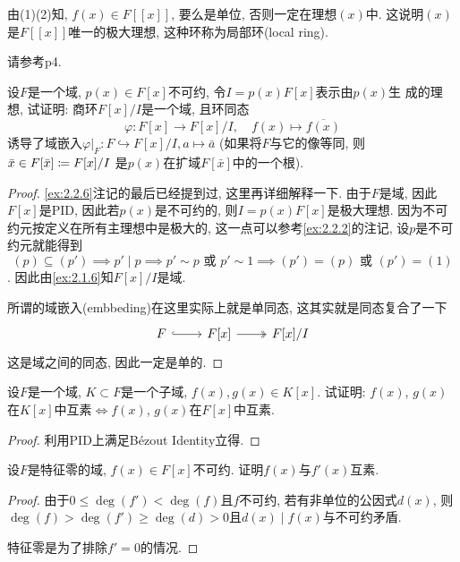 \begin{remark}
    由(1)(2)知, $f(x) \in F[[x]]$, 要么是单位, 否则一定在理想$(x)$中. 这说明$(x)$是$F[[x]]$唯一的极大理想, 这种环称为局部环(local ring).
    
    请参考\cite{atiyah1994introduction}p4.
\end{remark}

\begin{problem}
    设$F$是一个域, $p(x) \in F[x]$不可约, 令$I = p(x)F[x]$表示由$p(x)$生
成的理想, 试证明: 商环$F[x]/I$是一个域, 且环同态
\[
    \varphi:F[x] \to F[x]/I,\quad f(x) \mapsto \overline{f(x)}
\]
诱导了域嵌入$\varphi|_F: F\hookrightarrow F[x]/I, a \mapsto \bar{a}$
(如果将$F$与它的像等同, 则$\bar{x} \in F[\bar{x}] \mathrel{\coloneqq} F[x]/I$
是$p(x)$在扩域$F[\bar{x}]$中的一个根).
\end{problem}

\begin{proof}
    \ref{ex:2.2.6}注记的最后已经提到过, 这里再详细解释一下. 由于$F$是域, 因此$F[x]$是PID, 因此若$p(x)$是不可约的, 则$I = p(x)F[x]$是极大理想. 因为不可约元按定义在所有主理想中是极大的, 这一点可以参考\ref{ex:2.2.2}的注记, 设$p$是不可约元就能得到
    \[
        (p) \subseteq (p') \implies p' \mid p \implies p' \sim p \text{ 或 } p' \sim 1 \implies (p') = (p) \text{ 或 } (p') = (1)
    \]. 因此由\ref{ex:2.1.6}知$F[x]/I$是域.
    
    所谓的域嵌入(embbeding)在这里实际上就是单同态, 这其实就是同态复合了一下
    \[
        \begin{tikzcd}
            F \arrow[r, hook] & {F[x]} \arrow[r, two heads] & {F[x]/I}
        \end{tikzcd}
    \]
    这是域之间的同态, 因此一定是单的.
\end{proof}

\begin{problem}
    设$F$是一个域, $K \subset F$是一个子域, $f(x), g(x) \in K[x]$.
试证明: $f(x)$, $g(x)$在$K[x]$中互素$\Leftrightarrow f(x)$,
$g(x)$在$F[x]$中互素.
\end{problem}

\begin{proof}
    利用PID上满足Bézout Identity立得.
\end{proof}

\begin{problem}
    设$F$是特征零的域, $f(x) \in F[x]$不可约. 证明$f(x)$与$f'(x)$互素.
\end{problem}

\begin{proof}
    由于$0 \leqslant \deg(f') < \deg(f)$且$f$不可约, 若有非单位的公因式$d(x)$, 则$\deg(f) > \deg(f') \geqslant \deg(d) > 0$且$d(x) \mid f(x)$与不可约矛盾.

    特征零是为了排除$f' = 0$的情况.
\end{proof}

